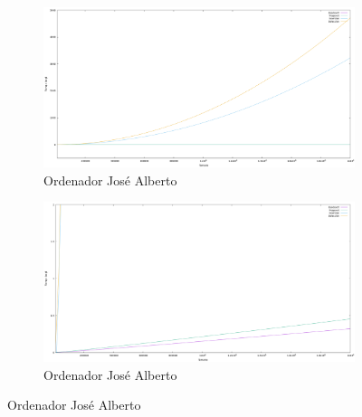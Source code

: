 \documentclass[10pt,a4paper]{article}
\begin{document}
 \begin{figure}[h!]
 	\begin{subfigure}{.5\textwidth}
 		\centering
 		\includegraphics[scale=0.13]{../../Images/Gráfica comparativa algoritmos de ordenación Joshoccas.png}
 		\caption{Ordenador José Alberto}
 	\end{subfigure}
 	\hfill
 	\begin{subfigure}{.5\textwidth}
 		\centering
 		\includegraphics[scale=0.13]{../../Images/Gráfica comparativa algoritmos ordenación Joshoccas (H y Q).png}
 		\caption{Ordenador José Alberto}
 	\end{subfigure}
 \end{figure}
\end{document}
